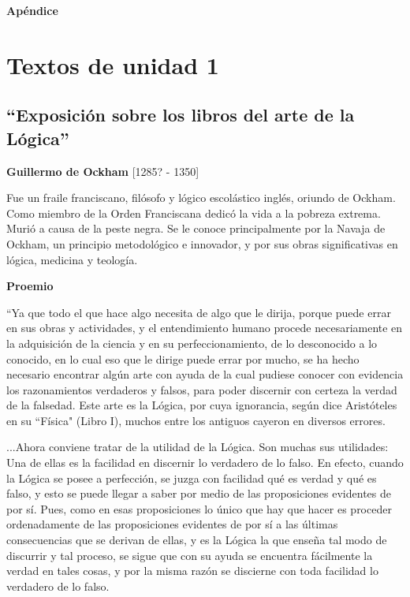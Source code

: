 \documentclass{article}
\begin{document}
\begin{center}
    \LARGE\textbf{{Apéndice}}
\end{center}

\tableofcontents
  
\newpage

\section{Textos de unidad 1}

\subsection{``Exposición sobre los libros del arte de la Lógica''}

\begin{center}
    \large{\textbf{Guillermo de Ockham} [1285? - 1350]} 
\end{center}
    Fue un fraile franciscano, filósofo y lógico escolástico inglés, oriundo de Ockham. Como miembro de la Orden Franciscana dedicó la vida a la pobreza extrema. Murió a causa de la peste negra. Se le conoce principalmente por la Navaja de Ockham, un principio metodológico e innovador, y por sus obras significativas en lógica, medicina y teología. \par
    
\begin{center}
    \large{\textbf{Proemio}}
\end{center}
    
    ``Ya que todo el que hace algo necesita de algo que le dirija, porque puede errar en sus obras y actividades, y el entendimiento humano procede necesariamente en la adquisición de la ciencia y en su perfeccionamiento, de lo desconocido a lo conocido, en lo cual eso que le dirige puede errar por mucho, se ha hecho necesario encontrar algún arte con ayuda de la cual pudiese conocer con evidencia los razonamientos verdaderos y falsos, para poder discernir con certeza la verdad de la falsedad. Este arte es la Lógica, por cuya ignorancia, según dice Aristóteles en su ``Física" (Libro I), muchos entre los antiguos cayeron en diversos errores. \par
    
    ...Ahora conviene tratar de la utilidad de la Lógica. Son muchas sus utilidades: Una de ellas es la facilidad en discernir lo verdadero de lo falso. En efecto, cuando la Lógica se posee a perfección, se juzga con facilidad qué es verdad y qué es falso, y esto se puede llegar a saber por medio de las proposiciones evidentes de por sí. Pues, como en esas proposiciones lo único que hay que hacer es proceder ordenadamente de las proposiciones evidentes de por sí a las últimas consecuencias que se derivan de ellas, y es la Lógica la que enseña tal modo de discurrir y tal proceso, se sigue que con su ayuda se encuentra fácilmente la verdad en tales cosas, y por la misma razón se discierne con toda facilidad lo verdadero de lo falso. \par
    
\end{document}
